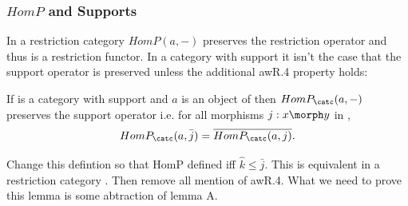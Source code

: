 \subsubsection{$HomP$ and Supports}
In a restriction category $HomP(a,-)$ preserves the restriction operator
and thus is a restriction functor. 
In a category with support it isn't the case that the support operator is preserved unless
the additional awR.4 property holds:
\begin{lemma}
If \catcw is a category with  support 
and $a$ is an object of \catcw then
$HomP_\catc(a,-)$ preserves the support operator
i.e.  
for all morphisms $j: x \morph y$ in \catc,
\begin{equation}
HomP_\catc(a,\bar{j})=\overline{HomP_\catc(a,j)}.
\end{equation}

\begin{notebox}
Change this defintion so that HomP defined
iff $\hat{k} \leq \bar{j}$. This is equivalent in a restriction category . Then remove all mention of awR.4.
What we need to prove this lemma is some abtraction of lemma A.
\end{notebox}
\end{lemma}
